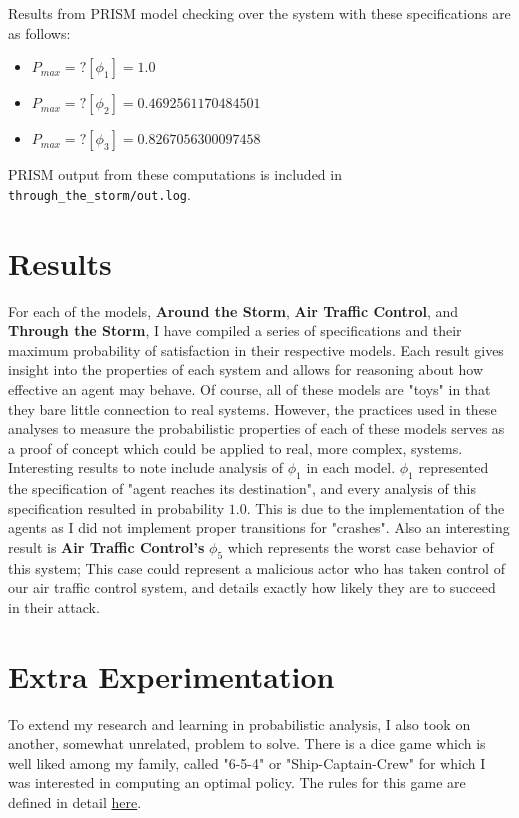\documentclass{article}
\begin{document}
Results from PRISM model checking over the system with these specifications are as follows:
\begin{itemize}
    \item $P_{max}=?[\phi_1] = 1.0$
    \item $P_{max}=?[\phi_2] = 0.4692561170484501$
    \item $P_{max}=?[\phi_3] = 0.8267056300097458$
\end{itemize}

PRISM output from these computations is included in \texttt{through\_the\_storm/out.log}.

\section{Results}

For each of the models, \textbf{Around the Storm}, \textbf{Air Traffic Control}, and \textbf{Through the Storm}, I have compiled a series of specifications and their maximum probability of satisfaction in their respective models. Each result gives insight into the properties of each system and allows for reasoning about how effective an agent may behave. Of course, all of these models are "toys" in that they bare little connection to real systems.  However, the practices used in these analyses to measure the probabilistic properties of each of these models serves as a proof of concept which could be applied to real, more complex, systems. \\

Interesting results to note include analysis of $\phi_1$ in each model. $\phi_1$ represented the specification of "agent reaches its destination", and every analysis of this specification resulted in probability $1.0$. This is due to the implementation of the agents as I did not implement proper transitions for "crashes". Also an interesting result is \textbf{Air Traffic Control's} $\phi_5$ which represents the worst case behavior of this system; This case could represent a malicious actor who has taken control of our air traffic control system, and details exactly how likely they are to succeed in their attack.

\section{Extra Experimentation}

To extend my research and learning in probabilistic analysis, I also took on another, somewhat unrelated, problem to solve. There is a dice game which is well liked among my family, called "6-5-4" or "Ship-Captain-Crew" for which I was interested in computing an optimal policy. The rules for this game are defined in detail \href{https://en.wikipedia.org/wiki/Ship,_captain,_and_crew}{here}. \\
\end{document}
